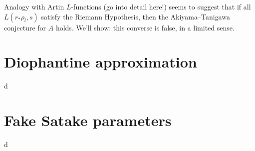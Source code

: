 \documentclass{article}
\begin{document}
Analogy with Artin $L$-functions (go into detail here!) seems to suggest that 
if all $L(r_\ast \rho_l,s)$ satisfy the Riemann Hypothesis, then the 
Akiyama--Tanigawa conjecture for $A$ holds. We'll show: this converse is false, 
in a limited sense. 





\section{Diophantine approximation}

d





\section{Fake Satake parameters}

d
\end{document}
